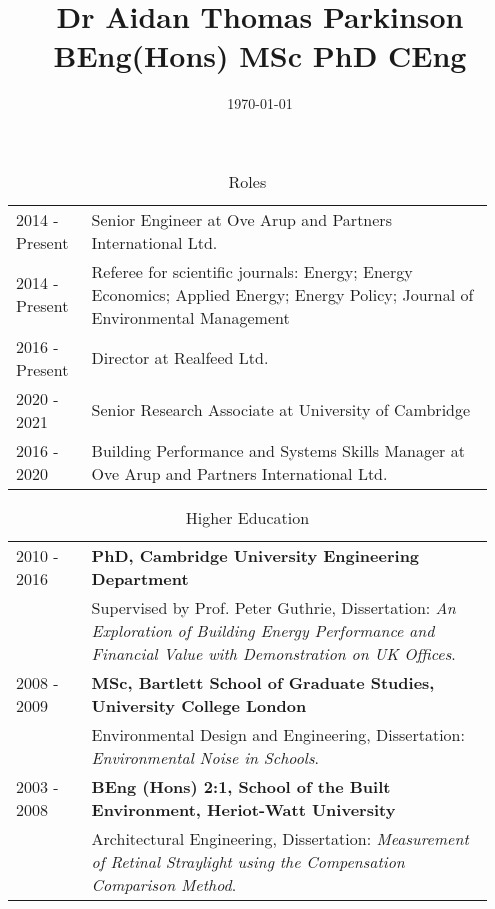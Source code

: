 \documentclass[11pt, oneside]{article}   	%
\title{Dr Aidan Thomas Parkinson BEng(Hons) MSc PhD CEng}
\author{}
\date{\today}							%
\begin{document}
\maketitle

\begin{table}[h]
\caption*{Roles}
\vspace{-5mm}
\small
\begin{center}
\begin{tabular}{p{0.15\linewidth} p{0.8\linewidth}}
\hline
2014 - Present&Senior Engineer at Ove Arup and Partners International Ltd. \\
2014 - Present&Referee for scientific journals: Energy; Energy Economics; Applied Energy; Energy Policy; Journal of Environmental Management \\
2016 - Present&Director at Realfeed Ltd.  \\
2020 - 2021&Senior Research Associate at University of Cambridge  \\
2016 - 2020&Building Performance and Systems Skills Manager at Ove Arup and Partners International Ltd.  \\
\hline
\end{tabular}
\end{center}
\vspace{-10mm}
\end{table}

\begin{table}[h]
\caption*{Higher Education}
\vspace{-5mm}
\small
\begin{center}
\begin{tabular}{p{0.15\linewidth} p{0.8\linewidth}}
\hline
2010 - 2016&\textbf{PhD, Cambridge University Engineering Department} \\
&Supervised by Prof. Peter Guthrie, Dissertation: \emph{An Exploration of Building Energy Performance and Financial Value with Demonstration on UK Offices}. \\
2008 - 2009&\textbf{MSc, Bartlett School of Graduate Studies, University College London} \\
&Environmental Design and Engineering, Dissertation: \emph{Environmental Noise in Schools}. \\
2003 - 2008&\textbf{BEng (Hons) 2:1, School of the Built Environment, Heriot-Watt University} \\
&Architectural Engineering, Dissertation: \emph{Measurement of Retinal Straylight using the Compensation Comparison Method}. \\
\hline
\end{tabular}
\end{center}
\vspace{-10mm}
\end{table}
\end{document}
